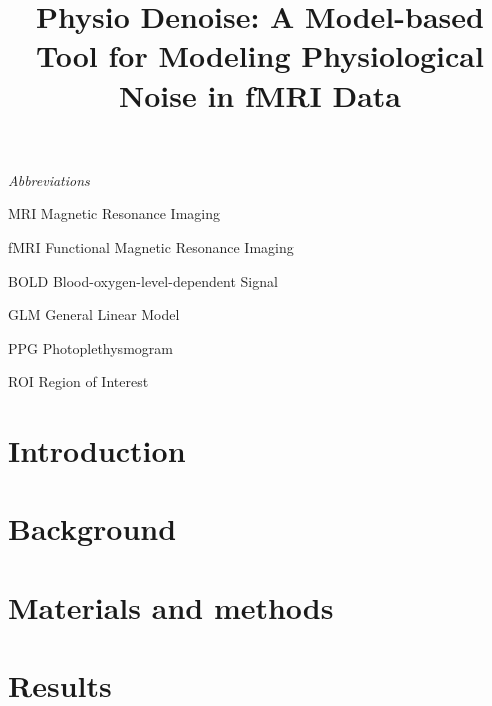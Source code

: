 \documentclass[conference]{IEEEtran}
\newcommand{\abbrlabel}[1]{\makebox[2cm][l]{\textbf{#1}\ \dotfill}}
\newenvironment{abbreviations}{\begin{list}{}{\renewcommand{\makelabel}{\abbrlabel}}}{\end{list}}
\begin{document}
\title{Physio Denoise: A Model-based Tool for Modeling Physiological Noise in fMRI Data\\}

\author{}

\maketitle

%


\textit{Abbreviations}
\begin{abbreviations}
\item[MRI] Magnetic Resonance Imaging
\item[fMRI] Functional Magnetic Resonance Imaging
\item[BOLD] Blood-oxygen-level-dependent Signal  
\item[GLM] General Linear Model
\item[PPG]  Photoplethysmogram 
\item[ROI] Region of Interest

\end{abbreviations}

\section{Introduction}\label{sec:Introduction}


\section{Background}\label{sec:Background}


\section{Materials and methods}\label{sec:Methods}


\section{Results}\label{sec:Results_And_Discussion}

\end{document}
